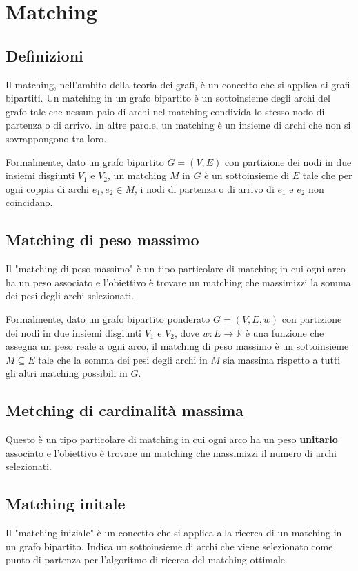 
\chapter{Matching}

\section{Definizioni}
Il matching, nell'ambito della teoria dei grafi, è un concetto che si applica ai grafi bipartiti. Un matching in un grafo bipartito è un sottoinsieme degli archi del grafo tale che nessun paio di archi nel matching condivida lo stesso nodo di partenza o di arrivo. In altre parole, un matching è un insieme di archi che non si sovrappongono tra loro.

Formalmente, dato un grafo bipartito $G = (V, E)$ con partizione dei nodi in due insiemi disgiunti $V_1$ e $V_2$, un matching $M$ in $G$ è un sottoinsieme di $E$ tale che per ogni coppia di archi $e_1, e_2 \in M$, i nodi di partenza o di arrivo di $e_1$ e $e_2$ non coincidano.


\section{Matching di peso massimo}
Il "matching di peso massimo" è un tipo particolare di matching in cui ogni arco ha un peso associato e l'obiettivo è trovare un matching che massimizzi la somma dei pesi degli archi selezionati.

Formalmente, dato un grafo bipartito ponderato $G = (V, E, w)$ con partizione dei nodi in due insiemi disgiunti $V_1$ e $V_2$, dove $w: E \rightarrow \mathbb{R}$ è una funzione che assegna un peso reale a ogni arco, il matching di peso massimo è un sottoinsieme $M \subseteq E$ tale che la somma dei pesi degli archi in $M$ sia massima rispetto a tutti gli altri matching possibili in $G$.

\section{Metching di cardinalità massima}
Questo \`e un tipo particolare di matching in cui ogni arco ha un peso \textbf{unitario} associato e l'obiettivo \`e trovare un matching che massimizzi il numero di archi selezionati.

\section{Matching initale}
Il "matching iniziale" è un concetto che si applica alla ricerca di un matching in un grafo bipartito. Indica un sottoinsieme di archi che viene selezionato come punto di partenza per l'algoritmo di ricerca del matching ottimale.

